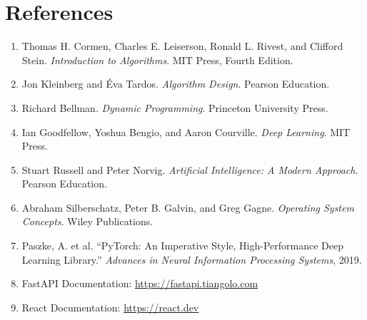 \documentclass[12pt,a4paper]{article}
\begin{document}
\section{References}
\begin{enumerate}
    \item Thomas H. Cormen, Charles E. Leiserson, Ronald L. Rivest, and Clifford Stein. \textit{Introduction to Algorithms}. MIT Press, Fourth Edition.
    \item Jon Kleinberg and Éva Tardos. \textit{Algorithm Design}. Pearson Education.
    \item Richard Bellman. \textit{Dynamic Programming}. Princeton University Press.
    \item Ian Goodfellow, Yoshua Bengio, and Aaron Courville. \textit{Deep Learning}. MIT Press.
    \item Stuart Russell and Peter Norvig. \textit{Artificial Intelligence: A Modern Approach}. Pearson Education.
    \item Abraham Silberschatz, Peter B. Galvin, and Greg Gagne. \textit{Operating System Concepts}. Wiley Publications.
    \item Paszke, A. et al. ``PyTorch: An Imperative Style, High-Performance Deep Learning Library.'' \textit{Advances in Neural Information Processing Systems}, 2019.
    \item FastAPI Documentation: \url{https://fastapi.tiangolo.com}
    \item React Documentation: \url{https://react.dev}
\end{enumerate}
\end{document}
